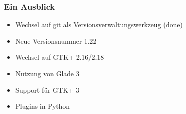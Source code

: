 \begin{frame}
	\frametitle{Ein Ausblick}
	\begin{block}
		\begin{itemize}
			\item Wechsel auf git als Versionsverwaltungswerkzeug (done)
			\item Neue Versionsnummer 1.22
			\item Wechsel auf GTK+ 2.16/2.18
			\item Nutzung von Glade 3
			\item Support für GTK+ 3
			\item Plugins in Python
		\end{itemize}
	\end{block}
\end{frame}
